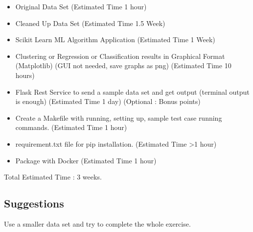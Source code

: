 \begin{itemize}
\item Original Data Set (Estimated Time 1 hour)
\item Cleaned Up Data Set (Estimated Time 1.5 Week)
\item Scikit Learn ML Algorithm Application (Estimated Time 1 Week)
\item Clustering or Regression or Classification results in Graphical Format (Matplotlib) (GUI not needed, save graphs as png) (Estimated Time 10 hours)
\item Flask Rest Service to send a sample data set and get output (terminal output is enough) (Estimated Time 1 day) (Optional : Bonus points)
\item Create a Makefile with running, setting up, sample test case running commands. (Estimated Time 1 hour)  
\item requirement.txt file for pip installation. (Estimated Time >1 hour)
\item Package with Docker  (Estimated Time 1 hour)
\end{itemize}

Total Estimated Time : 3 weeks.
\subsection{Suggestions}

Use a smaller data set and try to complete the whole exercise. 

